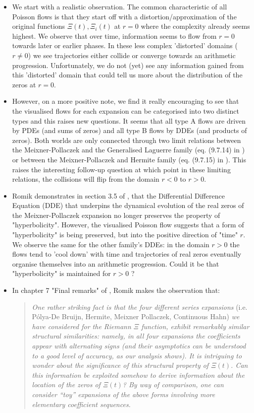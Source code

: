 \documentclass[a4paper,11pt,twoside]{amsart}
\begin{document}
\begin{itemize}
  \item We start with a realistic observation. The common characteristic of all Poisson flows is that they start off with a distortion/approximation of the original functions $\Xi(t), \Xi_i(t)$ at $r=0$ where the complexity already seems highest. We observe that over time, information seems to flow from $r=0$ towards later or earlier phases. In these less complex 'distorted' domains ($r \ne 0$) we see trajectories either collide or converge towards an arithmetic progression. Unfortunately, we do not (yet) see any information gained from this 'distorted' domain that could tell us more about the distribution of the zeros at $r=0$. 
\item However, on a more positive note, we find it really encouraging to see that the visualised flows for each expansion can be categorised into two distinct types and this raises new questions. It seems that all type A flows are driven by PDEs (and sums of zeros) and all type B flows by DDEs (and products of zeros). Both worlds are only connected through two limit relations between the Meixner-Pollaczek and the Generalised Laguerre family (eq. (9.7.14) in \cite{koe}) or between the Meixner-Pollaczek and Hermite family (eq. (9.7.15) in \cite{koe}). This raises the interesting follow-up question at which point in these limiting relations, the collisions will flip from the domain $r < 0$ to $r > 0$. 
\item Romik demonstrates in section 3.5 of \cite{rom}, that the Differential Difference Equation (DDE) that underpins the dynamical evolution of the real zeros of the Meixner-Pollaczek expansion no longer preserves the property of "hyperbolicity". However, the visualised Poisson flow suggests that a form of "hyperbolicity" is being preserved, but into the positive direction of "time" $r$. We observe the same for the other family's DDEs: in the domain $r > 0$ the flows tend to 'cool down' with time and trajectories of real zeros eventually organise themselves into an arithmetic progression. Could it be that "hyperbolicity" is maintained for $r > 0$ ? 
\item In chapter 7 "Final remarks" of \cite{rom}, Romik makes the observation that:
\begin{quotation}
\textit{One rather striking fact is that the four different series expansions} (i.e. Pólya-De Bruijn, Hermite, Meixner Pollaczek, Continuous Hahn) \textit{we have considered for the Riemann $\Xi$ function, exhibit remarkably similar structural similarities: namely, in all four expansions the coefficients appear with alternating signs (and their asymptotics can be understood to a good level of accuracy, as our analysis shows). It is intriguing to wonder about the significance of this structural property of $\Xi(t)$. Can this information be exploited somehow to derive information about the location of the zeros of $\Xi(t)$? By way of comparison, one can consider “toy” expansions of the above forms involving more elementary coefficient sequences.}
\end{quotation}


\end{itemize}
\end{document}
